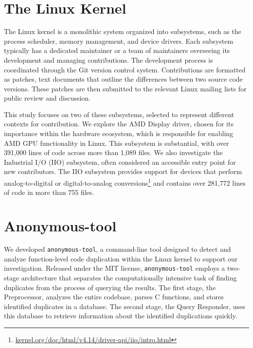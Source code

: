 \documentclass[12pt]{article}
\begin{document}
\section{The Linux Kernel}

The Linux kernel is a monolithic system organized into subsystems, such as the process scheduler, memory management, and device drivers. Each subsystem typically has a dedicated maintainer or a team of maintainers overseeing its development and managing contributions. The development process is coordinated through the Git version control system. Contributions are formatted as patches, text documents that outline the differences between two source code versions. These patches are then submitted to the relevant Linux mailing lists for public review and discussion.

This study focuses on two of these subsystems, selected to represent different contexts for contribution. We explore the AMD Display driver, chosen for its importance within the hardware ecosystem, which is responsible for enabling AMD GPU functionality in Linux. This subsystem is substantial, with over 391,000 lines of code across more than 1,089 files. We also investigate the Industrial I/O (IIO) subsystem, often considered an accessible entry point for new contributors. The IIO subsystem provides support for devices that perform analog-to-digital or digital-to-analog conversions\footnote{\href{https://kernel.org/doc/html/v4.14/driver-api/iio/intro.html}{kernel.org/doc/html/v4.14/driver-api/iio/intro.html}} and contains over 281,772 lines of code in more than 755 files.

\section{Anonymous-tool}

We developed \texttt{anonymous-tool}, a command-line tool designed to detect and analyze function-level code duplication within the Linux kernel to support our investigation. Released under the MIT license, \texttt{anonymous-tool} employs a two-stage architecture that separates the computationally intensive task of finding duplicates from the process of querying the results. The first stage, the Preprocessor, analyzes the entire codebase, parses C functions, and stores identified duplicates in a database. The second stage, the Query Responder, uses this database to retrieve information about the identified duplications quickly.
\end{document}
